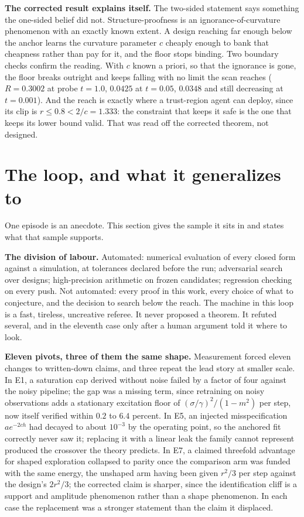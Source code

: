 \documentclass{article}
\begin{document}
\textbf{The corrected result explains itself.} The two-sided statement says
something the one-sided belief did not. Structure-proofness is an
ignorance-of-curvature phenomenon with an exactly known extent. A design
reaching far enough below the anchor learns the curvature parameter $c$
cheaply enough to bank that cheapness rather than pay for it, and the floor
stops binding. Two boundary checks confirm the reading. With $c$ known a
priori, so that the ignorance is gone, the floor breaks outright and keeps
falling with no limit the scan reaches ($R = 0.3002$ at probe $t = 1.0$,
$0.0425$ at $t = 0.05$, $0.0348$ and still decreasing at $t = 0.001$). And the
reach is exactly where a trust-region agent can deploy, since its clip is
$r \le 0.8 < 2/c = 1.333$: the constraint that keeps it safe is the one that
keeps its lower bound valid. That was read off the corrected theorem, not
designed.

\section{The loop, and what it generalizes to}
\label{sec:loop}

One episode is an anecdote. This section gives the sample it sits in and
states what that sample supports.

\textbf{The division of labour.} Automated: numerical evaluation of every
closed form against a simulation, at tolerances declared before the run;
adversarial search over designs; high-precision arithmetic on frozen
candidates; regression checking on every push. Not automated: every proof in
this work, every choice of what to conjecture, and the decision to search
below the reach. The machine in this loop is a fast, tireless, uncreative
referee. It never proposed a theorem. It refuted several, and in the eleventh
case only after a human argument told it where to look.

\textbf{Eleven pivots, three of them the same shape.} Measurement forced
eleven changes to written-down claims, and three repeat the lead story at
smaller scale. In E1, a saturation cap derived without noise failed by a
factor of four against the noisy pipeline; the gap was a missing term, since
retraining on noisy observations adds a stationary excitation floor of
$(\sigma/\gamma)^2/(1-m^2)$ per step, now itself verified within $0.2$ to
$6.4$ percent. In E5, an injected misspecification $a e^{-2ch}$ had decayed
to about $10^{-3}$ by the operating point, so the anchored fit correctly
never saw it; replacing it with a linear leak the family cannot represent
produced the crossover the theory predicts. In E7, a claimed threefold
advantage for shaped exploration collapsed to parity once the comparison arm
was funded with the same energy, the unshaped arm having been given $r^2/3$
per step against the design's $2r^2/3$; the corrected claim is sharper, since
the identification cliff is a support and amplitude phenomenon rather than a
shape phenomenon. In each case the replacement was a stronger statement than
the claim it displaced.
\end{document}
